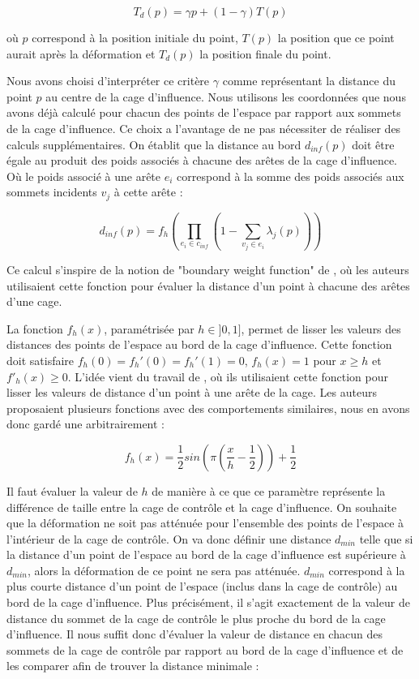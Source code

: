 \begin{equation}
  T_{d}(p) = \gamma p + (1-\gamma) T(p)
\end{equation}

où $p$ correspond à la position initiale du point, $T(p)$ la position que ce
point aurait après la déformation et $T_{d}(p)$ la position finale du point.

Nous avons choisi d'interpréter ce critère $\gamma$ comme représentant la
distance du point $p$ au centre de la cage d'influence. Nous utilisons les
coordonnées que nous avons déjà calculé pour chacun des points de l'espace par
rapport aux sommets de la cage d'influence. Ce choix a l'avantage de ne pas
nécessiter de réaliser des calculs supplémentaires. On établit que la distance
au bord $d_{inf}(p)$ doit être égale au produit des poids associés à chacune
des arêtes de la cage d'influence. Où le poids associé à une arête $e_i$
correspond à la somme des poids associés aux sommets incidents $v_j$ à cette
arête :

\begin{equation}
  d_{inf}(p) = f_h( \prod_{e_i \in c_{inf}} (1 - \sum_{v_j \in e_i} \lambda_j(p)))
\end{equation}

Ce calcul s'inspire de la notion de "boundary weight function" de
\cite{GPCP13}, où les auteurs utilisaient cette fonction pour évaluer la
distance d'un point à chacune des arêtes d'une cage.

La fonction $f_h(x)$, paramétrisée par $h \in ]0, 1]$, permet de lisser les
valeurs des distances des points de l'espace au bord de la cage d'influence.
Cette fonction doit satisfaire $f_h(0) = f_h'(0) = f_h'(1) = 0$, $f_h(x)=1$
pour $x \geq h$ et $f'_h(x) \geq 0$. L'idée vient du travail de \cite{GPCP13},
où ils utilisaient cette fonction pour lisser les valeurs de distance d'un
point à une arête de la cage. Les auteurs proposaient plusieurs fonctions avec
des comportements similaires, nous en avons donc gardé une arbitrairement :

\begin{equation}
  f_h(x) = \frac{1}{2} sin(\pi(\frac{x}{h} - \frac{1}{2})) + \frac{1}{2}
\end{equation}

Il faut évaluer la valeur de $h$ de manière à ce que ce paramètre représente
la différence de taille entre la cage de contrôle et la cage d'influence. On
souhaite que la déformation ne soit pas atténuée pour l'ensemble des points de
l'espace à l'intérieur de la cage de contrôle. On va donc définir une distance
$d_{min}$ telle que si la distance d'un point de l'espace au bord de la cage
d'influence est supérieure à $d_{min}$, alors la déformation de ce point ne
sera pas atténuée. $d_{min}$ correspond à la plus courte distance d'un point
de l'espace (inclus dans la cage de contrôle) au bord de la cage d'influence.
Plus précisément, il s'agit exactement de la valeur de distance du sommet de
la cage de contrôle le plus proche du bord de la cage d'influence. Il nous
suffit donc d'évaluer la valeur de distance en chacun des sommets de la cage
de contrôle par rapport au bord de la cage d'influence et de les comparer afin
de trouver la distance minimale :

